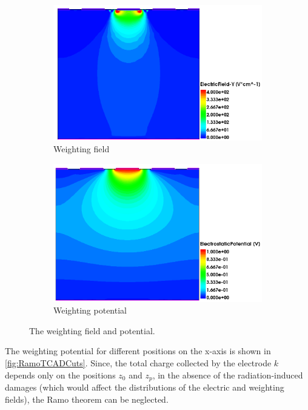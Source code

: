 \begin{figure}[htbp]
  \centering
  \begin{subfigure}[b]{0.49\textwidth}
    \centering
    \includegraphics[width=\textwidth]{figures/Ramo/EfieldY_Ramo.png}
    \caption{Weighting field}\label{fig:WeightingFieldRamo}
  \end{subfigure}\hfill
  \begin{subfigure}[b]{0.49\textwidth}
    \centering
    \includegraphics[width=\textwidth]{figures/Ramo/RamoPotential.png}
    \caption{Weighting potential}\label{fig:WeightingPotentialRamo}
  \end{subfigure} 
  \caption{The weighting field and potential.}\label{fig:RamoTCAD}
\end{figure}

The weighting potential for different positions on the
x-axis is shown in \cref{fig:RamoTCADCuts}. Since, the total
charge collected by the electrode $k$ depends only on the positions
$z_0$ and $z_p$, in the absence of the radiation-induced damages
(which would affect the distributions of the electric and weighting
fields), the Ramo theorem can be neglected.

